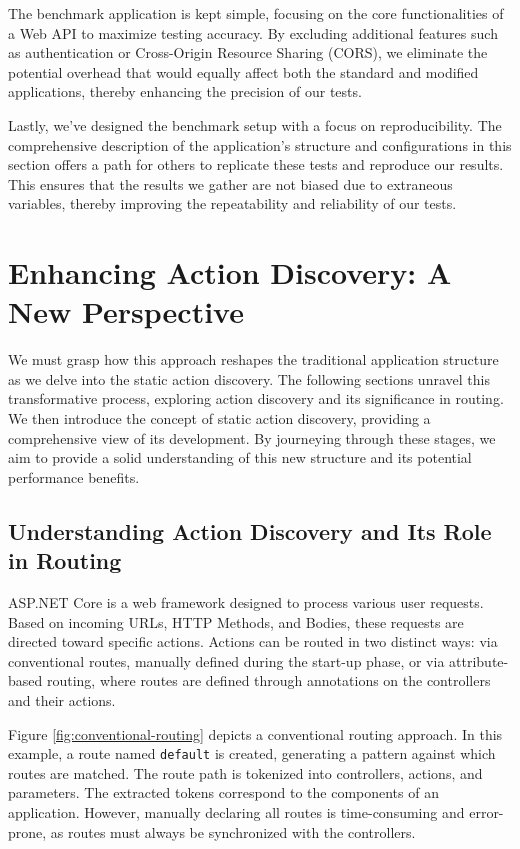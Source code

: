 The benchmark application is kept simple, focusing on the core functionalities of a Web API to maximize testing accuracy. By excluding additional features such as authentication or Cross-Origin Resource Sharing (CORS), we eliminate the potential overhead that would equally affect both the standard and modified applications, thereby enhancing the precision of our tests.

Lastly, we've designed the benchmark setup with a focus on reproducibility. The comprehensive description of the application's structure and configurations in this section offers a path for others to replicate these tests and reproduce our results. This ensures that the results we gather are not biased due to extraneous variables, thereby improving the repeatability and reliability of our tests.

\section{Enhancing Action Discovery: A New Perspective}

We must grasp how this approach reshapes the traditional application structure as we delve into the static action discovery. The following sections unravel this transformative process, exploring action discovery and its significance in routing. We then introduce the concept of static action discovery, providing a comprehensive view of its development. By journeying through these stages, we aim to provide a solid understanding of this new structure and its potential performance benefits.

\subsection{Understanding Action Discovery and Its Role in Routing}

ASP.NET Core is a web framework designed to process various user requests. Based on incoming URLs, HTTP Methods, and Bodies, these requests are directed toward specific actions. Actions can be routed in two distinct ways: via conventional routes, manually defined during the start-up phase, or via attribute-based routing, where routes are defined through annotations on the controllers and their actions.

Figure \ref{fig:conventional-routing} depicts a conventional routing approach. In this example, a route named \texttt{default} is created, generating a pattern against which routes are matched. The route path is tokenized into controllers, actions, and parameters. The extracted tokens correspond to the components of an application. However, manually declaring all routes is time-consuming and error-prone, as routes must always be synchronized with the controllers.

